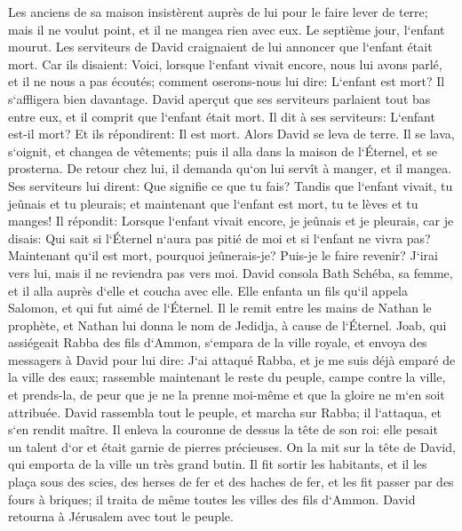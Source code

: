 \verse Les anciens de sa maison insistèrent auprès de lui pour le faire lever de terre; mais il ne voulut point, et il ne mangea rien avec eux. 
\verse Le septième jour, l`enfant mourut. Les serviteurs de David craignaient de lui annoncer que l`enfant était mort. Car ils disaient: Voici, lorsque l`enfant vivait encore, nous lui avons parlé, et il ne nous a pas écoutés; comment oserons-nous lui dire: L`enfant est mort? Il s`affligera bien davantage. 
\verse David aperçut que ses serviteurs parlaient tout bas entre eux, et il comprit que l`enfant était mort. Il dit à ses serviteurs: L`enfant est-il mort? Et ils répondirent: Il est mort. 
\verse Alors David se leva de terre. Il se lava, s`oignit, et changea de vêtements; puis il alla dans la maison de l`Éternel, et se prosterna. De retour chez lui, il demanda qu`on lui servît à manger, et il mangea. 
\verse Ses serviteurs lui dirent: Que signifie ce que tu fais? Tandis que l`enfant vivait, tu jeûnais et tu pleurais; et maintenant que l`enfant est mort, tu te lèves et tu manges! 
\verse Il répondit: Lorsque l`enfant vivait encore, je jeûnais et je pleurais, car je disais: Qui sait si l`Éternel n`aura pas pitié de moi et si l`enfant ne vivra pas? 
\verse Maintenant qu`il est mort, pourquoi jeûnerais-je? Puis-je le faire revenir? J`irai vers lui, mais il ne reviendra pas vers moi. 
\verse David consola Bath Schéba, sa femme, et il alla auprès d`elle et coucha avec elle. Elle enfanta un fils qu`il appela Salomon, et qui fut aimé de l`Éternel. 
\verse Il le remit entre les mains de Nathan le prophète, et Nathan lui donna le nom de Jedidja, à cause de l`Éternel. 
\verse Joab, qui assiégeait Rabba des fils d`Ammon, s`empara de la ville royale, 
\verse et envoya des messagers à David pour lui dire: J`ai attaqué Rabba, et je me suis déjà emparé de la ville des eaux; 
\verse rassemble maintenant le reste du peuple, campe contre la ville, et prends-la, de peur que je ne la prenne moi-même et que la gloire ne m`en soit attribuée. 
\verse David rassembla tout le peuple, et marcha sur Rabba; il l`attaqua, et s`en rendit maître. 
\verse Il enleva la couronne de dessus la tête de son roi: elle pesait un talent d`or et était garnie de pierres précieuses. On la mit sur la tête de David, qui emporta de la ville un très grand butin. 
\verse Il fit sortir les habitants, et il les plaça sous des scies, des herses de fer et des haches de fer, et les fit passer par des fours à briques; il traita de même toutes les villes des fils d`Ammon. David retourna à Jérusalem avec tout le peuple. 

\chapter{}

